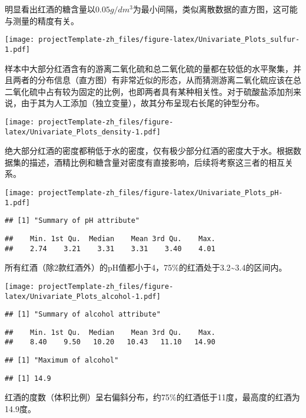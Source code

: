 \documentclass[]{article}
\begin{document}
明显看出红酒的糖含量以\(0.05g/dm^3\)为最小间隔，类似离散数据的直方图，这可能与测量的精度有关。

\texttt{[image: projectTemplate-zh\_files/figure-latex/Univariate\_Plots\_sulfur-1.pdf]}

样本中大部分红酒含有的游离二氧化硫和总二氧化硫的量都在较低的水平聚集，并且两者的分布信息（直方图）有非常近似的形态，从而猜测游离二氧化硫应该在总二氧化硫中占有较为固定的比例，也即两者具有某种相关性。对于硫酸盐添加剂来说，由于其为人工添加（独立变量），故其分布呈现右长尾的钟型分布。

\texttt{[image: projectTemplate-zh\_files/figure-latex/Univariate\_Plots\_density-1.pdf]}

绝大部分红酒的密度都稍低于水的密度，仅有极少部分红酒的密度大于水。根据数据集的描述，酒精比例和糖含量对密度有直接影响，后续将考察这三者的相互关系。

\texttt{[image: projectTemplate-zh\_files/figure-latex/Univariate\_Plots\_pH-1.pdf]}

\begin{verbatim}
## [1] "Summary of pH attribute"
\end{verbatim}

\begin{verbatim}
##    Min. 1st Qu.  Median    Mean 3rd Qu.    Max. 
##    2.74    3.21    3.31    3.31    3.40    4.01
\end{verbatim}

所有红酒（除2款红酒外）的pH值都小于4，75\%的红酒处于3.2\textasciitilde{}3.4的区间内。

\texttt{[image: projectTemplate-zh\_files/figure-latex/Univariate\_Plots\_alcohol-1.pdf]}

\begin{verbatim}
## [1] "Summary of alcohol attribute"
\end{verbatim}

\begin{verbatim}
##    Min. 1st Qu.  Median    Mean 3rd Qu.    Max. 
##    8.40    9.50   10.20   10.43   11.10   14.90
\end{verbatim}

\begin{verbatim}
## [1] "Maximum of alcohol"
\end{verbatim}

\begin{verbatim}
## [1] 14.9
\end{verbatim}

红酒的度数（体积比例）呈右偏斜分布，约75\%的红酒低于11度，最高度的红酒为14.9度。
\end{document}
